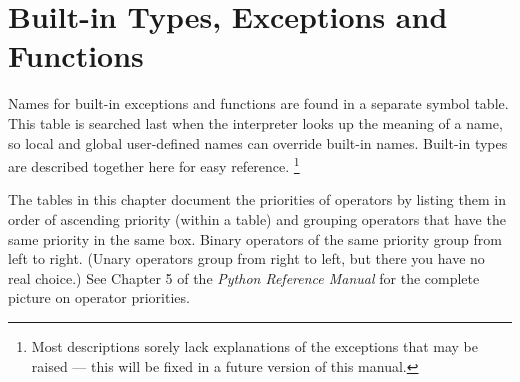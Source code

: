 \chapter{Built-in Types, Exceptions and Functions}


Names for built-in exceptions and functions are found in a separate
symbol table.  This table is searched last when the interpreter looks
up the meaning of a name, so local and global
user-defined names can override built-in names.  Built-in types are
described together here for easy reference.%
\footnote{Most descriptions sorely lack explanations of the exceptions
	that may be raised --- this will be fixed in a future version of
	this manual.}

The tables in this chapter document the priorities of operators by
listing them in order of ascending priority (within a table) and
grouping operators that have the same priority in the same box.
Binary operators of the same priority group from left to right.
(Unary operators group from right to left, but there you have no real
choice.)  See Chapter 5 of the \emph{Python Reference Manual} for the
complete picture on operator priorities.
